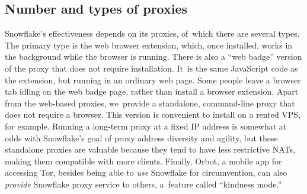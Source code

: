 \documentclass[letterpaper,twocolumn]{article}
\begin{document}

\subsection{Number and types of proxies}
\label{sec:proxies}

Snowflake's effectiveness depends on its proxies,
of~which there are several types.
The primary type is the web browser extension,
which, once installed, works in the background
while the browser is running.
There is also a ``web badge'' version of the proxy that does not require installation.
It~is the same JavaScript code as the extension, but running in an ordinary web page.
Some people leave a browser tab idling on the web badge page,
rather than install a browser extension.
Apart from the web-based proxies,
we~provide a standalone, command-line proxy
that does not require a browser.
This version is convenient to install on a rented VPS, for example.
Running a long-term proxy at a fixed IP address
is somewhat at odds with Snowflake's goal of proxy address diversity and agility,
but these standalone proxies are valuable because
they tend to have less restrictive NATs,
making them compatible with more clients.
Finally, Orbot, a mobile app for accessing Tor,
besides being able to \emph{use} Snowflake for circumvention,
can also \emph{provide} Snowflake proxy service to others,
a~feature called ``kindness mode.''
\end{document}
